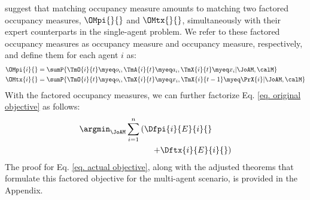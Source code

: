 \citet{seo2024idil} suggest that matching \AMoccu occupancy measure amounts to matching two factored occupancy measures, $\OMpi{}{}$ and $\OMtx{}{}$, simultaneously with their expert counterparts in the single-agent problem. We refer to these factored occupancy measures as \PIoccu occupancy measure and \TXoccu occupancy measure, respectively, and define them for each agent $i$ as:
\begin{align*}
    \OMpi{i}{} &= \sumP{\TmO{i}{t}\myeq o_i, \TmA{i}{t}\myeq a_i, \TmX{i}{t}\myeq x_i|\JoAM, \calM}\\
    \OMtx{i}{} &= \sumP{\TmO{i}{t}\myeq o_i, \TmX{i}{t}\myeq x_i, \TmX{i}{t-1}\myeq \PrX{i}|\JoAM, \calM}
\end{align*}
With the factored occupancy measures, we can further factorize Eq. \ref{eq. original objective} as follows:
\begin{align}
&\argmin_{\JoAM} \sum_{i=1}^n \left(\Dfpi{i}{E}{i}{} \right.  \nonumber \\
&\hspace{20ex}\left.+ \Dftx{i}{E}{i}{}\right)  \label{eq. actual objective}
\end{align}
The proof for Eq. \ref{eq. actual objective}, along with the adjusted theorems that formulate this factored objective for the multi-agent scenario, is provided in the Appendix.

